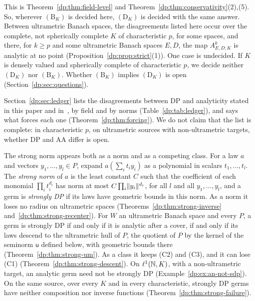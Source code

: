This is Theorem~\ref{dp:thm:field-level} and Theorem~\ref{dp:thm:conservativity}(2),(5). So, wherever $(\mathrm B_K)$ is decided here, $(\mathrm D_K)$ is decided with the same answer. Between ultrametric Banach spaces, the disagreements listed here occur over the complete, not spherically complete $K$ of characteristic $p$, for some spaces, and there, for $k\ge p$ and some ultrametric Banach spaces $E,D$, the map $A^k_{E,D;K}$ is analytic at no point (Proposition~\ref{dp:prop:strict}(1)). One case is undecided. If $K$ is densely valued and spherically complete of characteristic $p$, we decide neither $(\mathrm D_K)$ nor $(\mathrm B_K)$. Whether $(\mathrm B_K)$ implies $(\mathrm D_K)$ is open (Section~\ref{dp:sec:questions}).

Section~\ref{dp:sec:ledger} lists the disagreements between DP and analyticity stated in this paper and in~\cite{I}, by field and by norms (Table~\ref{dp:tab:ledger}), and says what forces each one (Theorem~\ref{dp:thm:forcing}). We do not claim that the list is complete: in characteristic $p$, on ultrametric sources with non-ultrametric targets, whether DP and AA differ is open.

The strong norm appears both as a norm and as a competing class. For a law $a$ and vectors $y_1,\dots,y_l\in P$, expand $a(\sum_it_iy_i)$ as a polynomial in scalars $t_1,\dots,t_l$. The \emph{strong norm} of $a$ is the least constant $C$ such that the coefficient of each monomial $\prod_it_i^{d_i}$ has norm at most $C\prod_i\lVert y_i\rVert^{d_i}$, for all $l$ and all $y_1,\dots,y_l$, and a germ is \emph{strongly DP} if its laws have geometric bounds in this norm. As a norm it loses no radius on ultrametric spaces (Theorems~\ref{dp:thm:strong-inverse} and~\ref{dp:thm:strong-recenter}). For $W$ an ultrametric Banach space and every $P$, a germ is strongly DP if and only if it is analytic after a cover, if and only if its laws descend to the ultrametric hull of $P$, the quotient of $P$ by the kernel of the seminorm $\mathsf u$ defined below, with geometric bounds there (Theorem~\ref{dp:thm:strong-um}). As a class it keeps (C2) and (C3), and it can lose (C1) (Theorem~\ref{dp:thm:strong-descent}). On $\ell^1(\mathbb N,K)$, with a non-ultrametric target, an analytic germ need not be strongly DP (Example~\ref{dp:ex:an-not-sdp}). On the same source, over every $K$ and in every characteristic, strongly DP germs have neither composition nor inverse functions (Theorem~\ref{dp:thm:strong-failure}).

